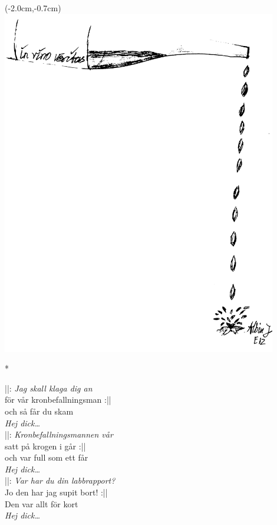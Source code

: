 \begin{textblock*}{3cm}(-2.0cm,-0.7cm) %
    \includegraphics[width=12cm]{./bilder/in_vino_veritas.png}
\end{textblock*}

*\vspace{1cm}

\noindent ||: \textit{Jag skall klaga dig an}\\
\noindent för vår kronbefallningsman :||\\
\noindent och så får du skam\\
\noindent \textit{Hej dick…}\\

\noindent ||: \textit{Kronbefallningsmannen vår}\\
\noindent satt på krogen i går :||\\
\noindent och var full som ett får\\
\noindent \textit{Hej dick…}\\

\noindent ||: \textit{Var har du din labbrapport?}\\
\noindent Jo den har jag supit bort! :||\\
\noindent Den var allt för kort\\
\noindent \textit{Hej dick…}\\

